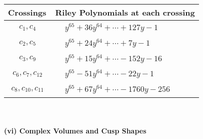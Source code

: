 \documentclass[1p]{elsarticle_modified}
\theoremstyle{definition}
\begin{document}
\begin{tabular}{m{50pt}|m{274pt}}
Crossings & \hspace{64pt}Riley Polynomials at each crossing \\
\hline $$\begin{aligned}c_{1},c_{4}\end{aligned}$$&$\begin{aligned}
&y^{65}+36 y^{64}+\cdots+127 y-1
\end{aligned}$\\
\hline $$\begin{aligned}c_{2},c_{5}\end{aligned}$$&$\begin{aligned}
&y^{65}+24 y^{64}+\cdots+7 y-1
\end{aligned}$\\
\hline $$\begin{aligned}c_{3},c_{9}\end{aligned}$$&$\begin{aligned}
&y^{65}+15 y^{64}+\cdots-152 y-16
\end{aligned}$\\
\hline $$\begin{aligned}c_{6},c_{7},c_{12}\end{aligned}$$&$\begin{aligned}
&y^{65}-51 y^{64}+\cdots-22 y-1
\end{aligned}$\\
\hline $$\begin{aligned}c_{8},c_{10},c_{11}\end{aligned}$$&$\begin{aligned}
&y^{65}+67 y^{64}+\cdots-1760 y-256
\end{aligned}$\\
\hline
\end{tabular}\\~\\
\newpage\flushleft \textbf{(vi) Complex Volumes and Cusp Shapes}
\end{document}
